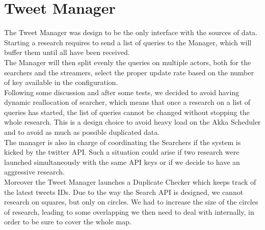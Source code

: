 \section{Tweet Manager}

The Tweet Manager was design to be the only interface with the sources of data. Starting a research requires to send a list of queries to the Manager, which will buffer them until all have been received. \\
The Manager will then split evenly the queries on multiple actors, both for the searchers and the streamers, select the proper update rate based on the number of key available in the configuration. \\
Following some discussion and after some tests, we decided to avoid having dynamic reallocation of searcher, which means that once a research on a list of queries has started, the list of queries cannot be changed without stopping the whole research. This is a design choice to avoid heavy load on the Akka Scheduler and to avoid as much as possible duplicated data.\\
The manager is also in charge of coordinating the Searchers if the system is kicked by the twitter API. Such a situation could arise if two research were launched simultaneously with the same API keys or if we decide to have an aggressive research. \\

Moreover the Tweet Manager launches a Duplicate Checker which keeps track of the latest tweets IDs. Due to the way the Search API is designed, we cannot research on squares, but only on circles. We had to increase the size of the circles of research, leading to some overlapping we then need to deal with internally, in order to be sure to cover the whole map.